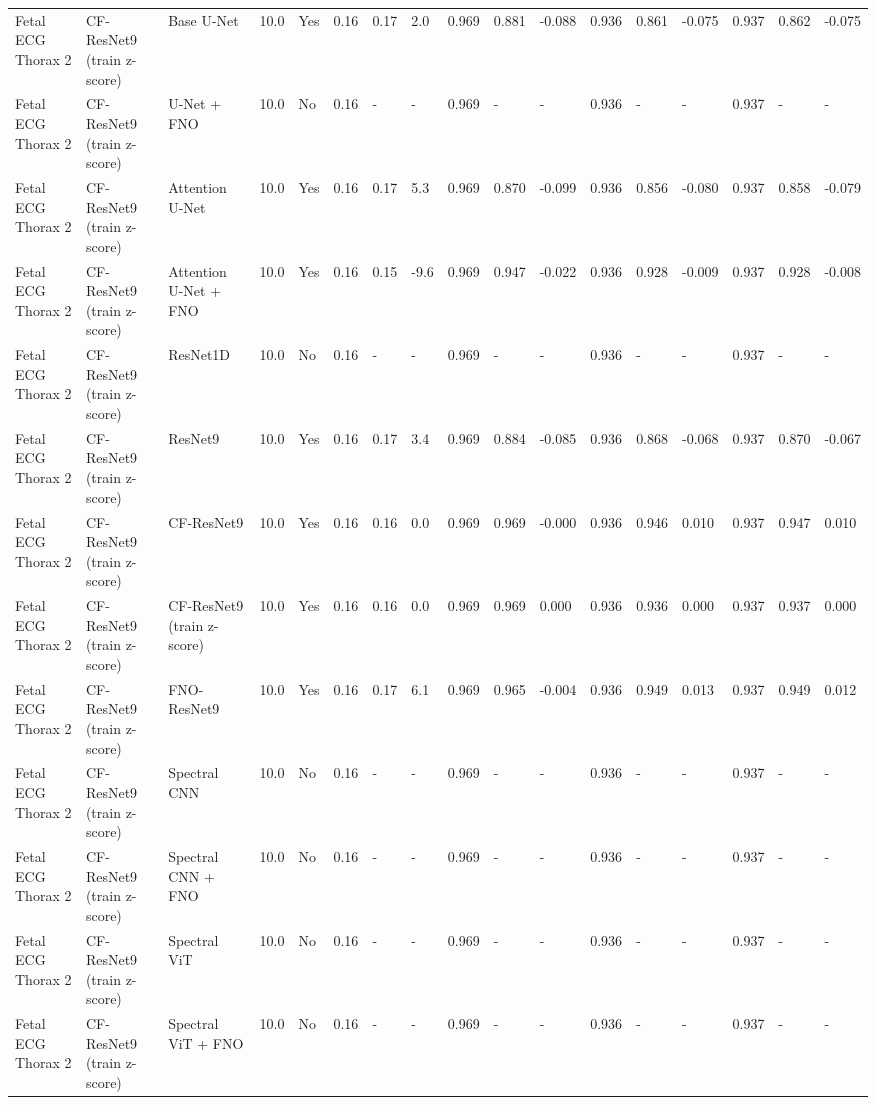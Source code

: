 \begin{longtable}{lllllllllllllllll}
Fetal ECG Thorax 2 & CF-ResNet9 (train z-score) & Base U-Net & 10.0 & Yes & 0.16 & 0.17 & 2.0 & 0.969 & 0.881 & -0.088 & 0.936 & 0.861 & -0.075 & 0.937 & 0.862 & -0.075 \\
Fetal ECG Thorax 2 & CF-ResNet9 (train z-score) & U-Net + FNO & 10.0 & No & 0.16 & - & - & 0.969 & - & - & 0.936 & - & - & 0.937 & - & - \\
Fetal ECG Thorax 2 & CF-ResNet9 (train z-score) & Attention U-Net & 10.0 & Yes & 0.16 & 0.17 & 5.3 & 0.969 & 0.870 & -0.099 & 0.936 & 0.856 & -0.080 & 0.937 & 0.858 & -0.079 \\
Fetal ECG Thorax 2 & CF-ResNet9 (train z-score) & Attention U-Net + FNO & 10.0 & Yes & 0.16 & 0.15 & -9.6 & 0.969 & 0.947 & -0.022 & 0.936 & 0.928 & -0.009 & 0.937 & 0.928 & -0.008 \\
Fetal ECG Thorax 2 & CF-ResNet9 (train z-score) & ResNet1D & 10.0 & No & 0.16 & - & - & 0.969 & - & - & 0.936 & - & - & 0.937 & - & - \\
Fetal ECG Thorax 2 & CF-ResNet9 (train z-score) & ResNet9 & 10.0 & Yes & 0.16 & 0.17 & 3.4 & 0.969 & 0.884 & -0.085 & 0.936 & 0.868 & -0.068 & 0.937 & 0.870 & -0.067 \\
Fetal ECG Thorax 2 & CF-ResNet9 (train z-score) & CF-ResNet9 & 10.0 & Yes & 0.16 & 0.16 & 0.0 & 0.969 & 0.969 & -0.000 & 0.936 & 0.946 & 0.010 & 0.937 & 0.947 & 0.010 \\
Fetal ECG Thorax 2 & CF-ResNet9 (train z-score) & CF-ResNet9 (train z-score) & 10.0 & Yes & 0.16 & 0.16 & 0.0 & 0.969 & 0.969 & 0.000 & 0.936 & 0.936 & 0.000 & 0.937 & 0.937 & 0.000 \\
Fetal ECG Thorax 2 & CF-ResNet9 (train z-score) & FNO-ResNet9 & 10.0 & Yes & 0.16 & 0.17 & 6.1 & 0.969 & 0.965 & -0.004 & 0.936 & 0.949 & 0.013 & 0.937 & 0.949 & 0.012 \\
Fetal ECG Thorax 2 & CF-ResNet9 (train z-score) & Spectral CNN & 10.0 & No & 0.16 & - & - & 0.969 & - & - & 0.936 & - & - & 0.937 & - & - \\
Fetal ECG Thorax 2 & CF-ResNet9 (train z-score) & Spectral CNN + FNO & 10.0 & No & 0.16 & - & - & 0.969 & - & - & 0.936 & - & - & 0.937 & - & - \\
Fetal ECG Thorax 2 & CF-ResNet9 (train z-score) & Spectral ViT & 10.0 & No & 0.16 & - & - & 0.969 & - & - & 0.936 & - & - & 0.937 & - & - \\
Fetal ECG Thorax 2 & CF-ResNet9 (train z-score) & Spectral ViT + FNO & 10.0 & No & 0.16 & - & - & 0.969 & - & - & 0.936 & - & - & 0.937 & - & - \\

\end{longtable}
